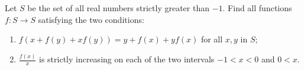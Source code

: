 Let $ S$ be the set of all real numbers strictly greater than $-1$. Find all functions $ f: S \to S$ satisfying the two conditions:

\begin{enumerate}[label = --]
	\item $ f(x + f(y) + xf(y)) = y + f(x) + yf(x)$ for all $ x, y$ in $ S$;
	\item $ \frac {f(x)}{x}$ is strictly increasing on each of the two intervals $ - 1 < x < 0$ and $ 0 < x$.
\end{enumerate}
